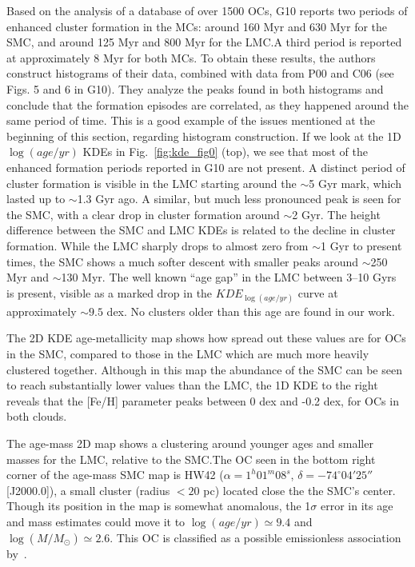 \documentclass{aa}
\begin{document}
Based on the analysis of a database of over 1500 OCs, G10 reports two periods of
enhanced cluster formation in the MCs: around 160 Myr and 630 Myr for the SMC,
and around 125 Myr and 800 Myr for the LMC.\@ A third period is reported at
approximately 8 Myr for both MCs.
%
To obtain these results, the authors construct histograms of their data,
combined with data from P00 and C06 (see Figs. 5 and 6 in G10). They analyze the
peaks found in both histograms and conclude that the formation episodes are
correlated, as they happened around the same period of time.
%
This is a good example of the issues mentioned at the beginning of this section,
regarding histogram construction. If we look at the 1D $\log(age/yr)$ KDEs in
Fig.~\ref{fig:kde_fig0} (top), we see that most of the enhanced formation
periods reported in G10 are not present.
A distinct period of cluster formation is visible in the LMC starting around the
${\sim}$5 Gyr mark, which lasted up to ${\sim}$1.3 Gyr ago.
A similar, but much less pronounced peak is seen for the SMC, with a clear drop
in cluster formation around ${\sim}$2 Gyr.
The height difference  between the SMC and LMC KDEs is related to the decline in
cluster formation. While the LMC sharply drops to almost zero from ${\sim}$1 Gyr
to present times, the SMC shows a much softer descent with smaller peaks
around ${\sim}$250 Myr and ${\sim}$130 Myr.
The well known ``age gap'' in the LMC between 3--10 Gyrs~\citep{Balbinot_2010}
is present, visible as a marked drop in the $KDE_{\log(age/yr)}$ curve at
approximately $\sim9.5$ dex. No clusters older than this age are found in our
work.

The 2D KDE age-metallicity map shows how spread out these values are for OCs in
the SMC, compared to those in the LMC which are much more heavily
clustered together.
Although in this map the abundance of the SMC can be seen to reach
substantially lower values than the LMC, the 1D KDE to the right reveals that
the [Fe/H] parameter peaks between 0 dex and -0.2 dex, for OCs in both clouds.

The age-mass 2D map shows a clustering around younger ages and smaller masses
for the LMC, relative to the SMC.\@ The OC seen in the bottom right corner of
the age-mass SMC map is HW42 ($\alpha{=}1^h01^m08^s$, $\delta
{=}-74^\circ04'25''$ [J2000.0]), a small cluster (radius ${<}20$ pc) located
close the the SMC's center. Though its position in the map is somewhat
anomalous, the 1$\sigma$ error in its age and mass estimates could move it to
$\log(age/yr){\simeq}9.4$ and $\log(M/M_{\odot}){\simeq}2.6$. This OC is
classified as a possible emissionless association by~\cite{Bica_1995}.
\end{document}
